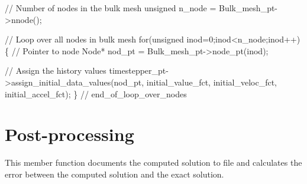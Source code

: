 \begin{DoxyCodeInclude}
   \textcolor{comment}{// Number of nodes in the bulk mesh}
   \textcolor{keywordtype}{unsigned} n\_node = Bulk\_mesh\_pt->nnode();

   \textcolor{comment}{// Loop over all nodes in bulk mesh}
   \textcolor{keywordflow}{for}(\textcolor{keywordtype}{unsigned} inod=0;inod<n\_node;inod++)
    \{
     \textcolor{comment}{// Pointer to node}
     Node* nod\_pt = Bulk\_mesh\_pt->node\_pt(inod);

     \textcolor{comment}{// Assign the history values}
     timestepper\_pt->assign\_initial\_data\_values(nod\_pt,
                                                initial\_value\_fct,
                                                initial\_veloc\_fct,
                                                initial\_accel\_fct);
    \} \textcolor{comment}{// end\_of\_loop\_over\_nodes}

\end{DoxyCodeInclude}




 

\hypertarget{index_doc}{}\section{Post-\/processing}\label{index_doc}
This member function documents the computed solution to file and calculates the error between the computed solution and the exact solution.


